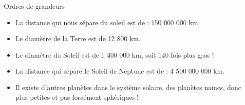 \documentclass[xcolor={dvipsnames}]{beamer}
\begin{document}
\begin{frame}
\begin{block}{Ordres de grandeurs}
	\begin{itemize}
		\item La distance qui nous sépare du soleil est de : 150 000 000 km.
		\item Le diamètre de la Terre est de 12 800 km.
		\item Le diamètre du Soleil est de 1 400 000 km, soit 140 fois plus gros !
		\item La distance qui sépare le Soleil de Neptune est de : 
		4 500 000 000 km.
		\item Il existe d’autres planètes dans le système solaire, des planètes naines, donc plus petites et pas forcément sphériques !
		
	\end{itemize}
\end{block}

\end{frame}
\end{document}
